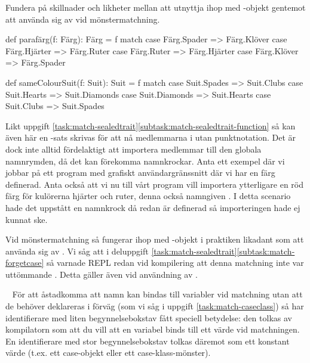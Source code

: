 \Subtask
Fundera på skillnader och likheter mellan att utnyttja  ihop med -objekt gentemot att använda sig av  vid mönstermatchning.


\SOLUTION


\TaskSolved \what
\SubtaskSolved
\ifswedish
\begin{Code}
def parafärg(f: Färg): Färg = f match
  case Färg.Spader  => Färg.Klöver
  case Färg.Hjärter => Färg.Ruter
  case Färg.Ruter   => Färg.Hjärter
  case Färg.Klöver  => Färg.Spader
\end{Code}
\else
\begin{Code}
def sameColourSuit(f: Suit): Suit = f match
  case Suit.Spades  => Suit.Clubs
  case Suit.Hearts => Suit.Diamonds
  case Suit.Diamonds   => Suit.Hearts
  case Suit.Clubs  => Suit.Spades
\end{Code}
\fi
Likt uppgift \ref{task:match-sealedtrait}\ref{subtask:match-sealedtrait-function} så kan även här en -sats skrivas för att nå medlemmarna i \ifswedish{}\else{}\fi{} utan punktnotation.
Det är dock inte alltid fördelaktigt att importera medlemmar till den globala namnrymden, då det kan förekomma namnkrockar. Anta ett exempel där vi jobbar på ett program med grafiskt användargränssnitt där vi har en färg  definerad.
Anta också att vi nu till vårt program vill importera ytterligare en röd färg för kulörerna hjärter och ruter, denna också namngiven . I detta scenario hade det uppstått en namnkrock då  redan är definerad så importeringen hade ej kunnat ske.

\SubtaskSolved
Vid mönstermatchning så fungerar  ihop med -objekt i praktiken likadant som att använda sig av .
Vi såg att i deluppgift \ref{task:match-sealedtrait}\ref{subtask:match-forgetcase} så varnade REPL redan vid kompilering att denna matchning inte var uttömmande . Detta gäller även vid användning av .

\QUESTEND




\QUESTBEGIN

\Task  \what~  För att åstadkomma att namn kan bindas till variabler vid matchning utan att de behöver deklareras i förväg (som vi såg i uppgift \ref{task:match-caseclass}) så har identifierare med liten begynnelsebokstav fått speciell betydelse: den tolkas av kompilatorn som att du vill att en variabel  binds till ett värde vid matchningen. En identifierare med stor begynnelsebokstav tolkas däremot som ett konstant värde (t.ex. ett case-objekt eller ett case-klass-mönster).

